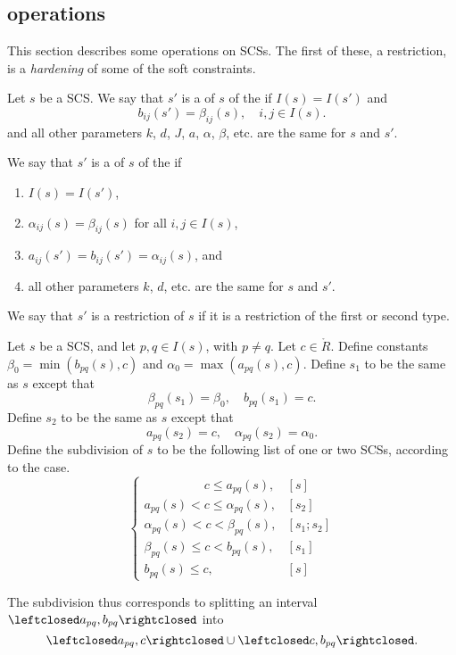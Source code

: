 






\subsection{operations}

This section describes some operations on SCSs.  
The first of these, a restriction,
 is a {\it hardening} of some of the soft constraints.


\begin{definition}[restriction]
Let $s$ be a SCS.
We say that $s'$ is a  of $s$ of the  if $I(s)=I(s')$ and
\[
b_{ij}(s') =  \beta_{ij}(s), \quad i,j\in I(s).
\]
and all other parameters $k$, $d$, $J$, $a$, $\alpha$, $\beta$, etc. are
the same for $s$ and $s'$.

We say that $s'$ is a  of $s$ of the  if 
\begin{enumerate}
\item $I(s)=I(s')$,
\item $\alpha_{ij}(s)=\beta_{ij}(s)$ for all $i,j\in I(s)$,
\item
$a_{ij}(s') = b_{ij}(s') = \alpha_{i j} (s)$,
and 
\item all other parameters $k$, $d$, etc.
are
the same for $s$ and $s'$.
\end{enumerate}
We say that $s'$ is a restriction of $s$ if it is a restriction of
the first or second type.
\end{definition}


\begin{definition}[subdivision] 
Let $s$ be a SCS,
and let $p,q\in  I(s)$, with $p\ne q$.  Let $c\in\ring{R}$.
Define constants $\beta_0 = \min(b_{pq}(s),c)$ and $\alpha_0=\max(a_{pq}(s),c)$.
Define $s_1$ to be the same as $s$ except that
\[
\beta_{pq}(s_1)= \beta_0,\quad b_{pq}(s_1) = c.
\]
Define $s_2$ to be the same as $s$ except that
\[
a_{pq}(s_2) = c,\quad \alpha_{pq}(s_2) = \alpha_0.
\]
Define the subdivision of $s$ to be the following list of one or two SCSs, according to the case.
\[
\begin{cases}
\phantom{a_{pq}(s) \le } c \le a_{pq}(s), & [s] \\
a_{pq}(s) < c \le \alpha_{pq}(s), & [s_2] \\
\alpha_{pq}(s) < c < \beta_{pq}(s), & [s_1;s_2] \\
\beta_{pq}(s) \le c < b_{pq}(s), & [s_1]\\
b_{pq}(s) \le c, & [s]
\end{cases}
\]
\end{definition}
The subdivision thus corresponds to splitting an interval 
$\leftclosed a_{pq},b_{pq}\rightclosed$ into
\[
\leftclosed a_{pq},c\rightclosed \cup \leftclosed c,b_{pq}\rightclosed.
\]

